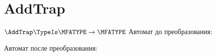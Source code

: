 \section{AddTrap}
\begin{frame}{$\AddTrap\TypeIs\MFATYPE\to\MFATYPE$}
	Автомат до преобразования:

	Автомат после преобразования:

\end{frame}
